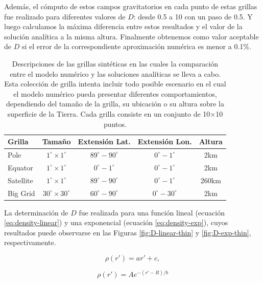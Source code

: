 \documentclass[a4paper,10pt]{article}
\begin{document}
Además, el cómputo de estos campos gravitatorios en cada punto de estas grillas fue realizado para diferentes valores de $D$: desde 0.5 a 10 con un paso de 0.5.
Y luego calculamos la máxima diferencia entre estos resultados y el valor de la solución analítica a la misma altura.
Finalmente obtenemos como valor aceptable de $D$ si el error de la correspondiente aproximación numérica es menor a 0.1\%.

\begin{table}
\centering
\caption{
    Descripciones de las grillas sintéticas en las cuales la comparación entre el modelo numérico y las soluciones analíticas se lleva a cabo. Esta colección de grilla intenta incluir todo posible escenario en el cual el modelo numérico pueda presentar diferentes comportamientos, dependiendo del tamaño de la grilla, su ubicación o su altura sobre la superficie de la Tierra. Cada grilla consiste en un conjunto de 10$\times$10 puntos.
}
\label{tab:grids}
\begin{tabular}{lcccc}
    Grilla & Tamaño & Extensión Lat. & Extensión Lon. & Altura \\ \hline
    Pole & $1^\circ \times 1^\circ$ & $89^\circ - 90^\circ$ & $0^\circ - 1^\circ$ & 2km \\
    Equator & $1^\circ \times 1^\circ$ & $0^\circ - 1^\circ$ & $0^\circ - 1^\circ$ & 2km \\
    Satellite & $1^\circ \times 1^\circ$ & $89^\circ - 90^\circ$ & $0^\circ - 1^\circ$ & 260km \\
    Big Grid & $30^\circ \times 30^\circ$ & $60^\circ - 90^\circ$ & $0^\circ - 30^\circ$ & 2km \\
\end{tabular}
\end{table}

La determinación de $D$ fue realizada para una función lineal (ecuación \ref{eq:density-linear}) y una exponencial (ecuación \ref{eq:density-exp}), cuyos resultados puede observarse en las Figuras \ref{fig:D-linear-thin} y \ref{fig:D-exp-thin}, respectivamente.

\begin{equation}
    \rho(r') = ar' + c,
    \label{eq:density-linear}
\end{equation}

\begin{equation}
    \rho(r') = A e^{-(r' - R)/b}
\label{eq:density-exp}
\end{equation}
\end{document}
